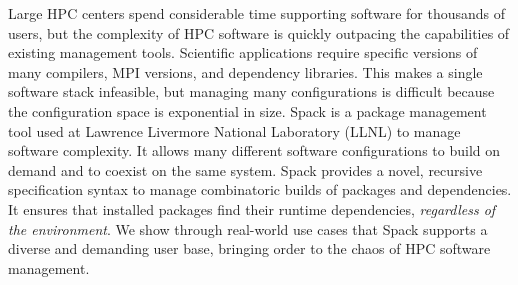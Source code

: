 
Large HPC centers spend considerable time supporting software for thousands of users, but the complexity of HPC software is quickly outpacing the capabilities of existing management tools. Scientific applications require specific versions of many compilers, MPI versions, and dependency libraries.  This makes a single software stack infeasible, but managing many configurations is difficult because the configuration space is exponential in size.
%
Spack is a package management tool used at Lawrence Livermore National Laboratory (LLNL) to manage software complexity. It allows many different software configurations to build on demand and to coexist on the same system. Spack provides a novel, recursive specification syntax to manage combinatoric builds of packages and dependencies.  It ensures that installed packages find their runtime dependencies, {\it regardless of the environment}. We show through real-world use cases that Spack supports a diverse and demanding user base, bringing order to the chaos of HPC software management.
